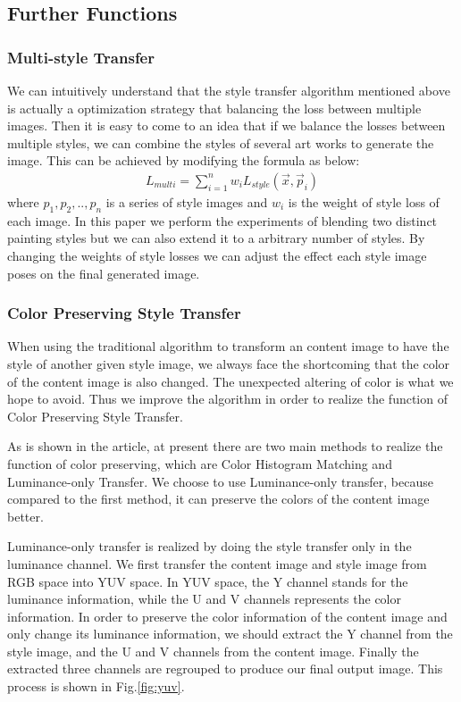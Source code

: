 \documentclass[runningheads]{llncs}
\begin{document}
\subsection{Further Functions}

\subsubsection{Multi-style Transfer}
We can intuitively understand that the style transfer algorithm mentioned above is actually a optimization strategy that balancing the loss between multiple images. Then it is easy to come to an idea that if we balance the losses between multiple styles, we can combine the styles of several art works to generate the image. This can be achieved by modifying the formula as below:
\begin{align}
    L_{multi}=\sum_{i=1}^{n}w_{i}L_{style}(\vec{x},\vec{p}_{i})
\end{align}
where ${p_{1}, p_{2},.., p_{n}}$ is a series of style images and $w_i$ is the weight of style loss of each image. In this paper we perform the experiments of blending two distinct painting styles but we can also extend it to a arbitrary number of styles. By changing the weights of style losses we can adjust the effect each style image poses on the final generated image.

\subsubsection{Color Preserving Style Transfer}
When using the traditional algorithm to transform an content image to have the style of another given style image, we always face the shortcoming that the color of the content image is also changed. %
The unexpected altering of color is what we hope to avoid. Thus we improve the algorithm in order to realize the function of Color Preserving Style Transfer.

As is shown in the article\cite{gatys2016preserving}, at present there are two main methods to realize the function of color preserving, which are Color Histogram Matching and Luminance-only Transfer. We choose to use Luminance-only transfer, because compared to the first method, it can preserve the colors of the content image better.

Luminance-only transfer is realized by doing the style transfer only in the luminance channel. We first transfer the content image and style image  from RGB space into YUV space. In YUV space, the Y channel stands for the luminance information, while the U and V channels represents the color information. In order to preserve the color information of the content image and only change its luminance information, we should extract the Y channel from the style image, and the U and V channels from the content image. Finally the extracted three channels are regrouped to produce our final output image. This process is shown in Fig.\ref{fig:yuv}.
\end{document}
